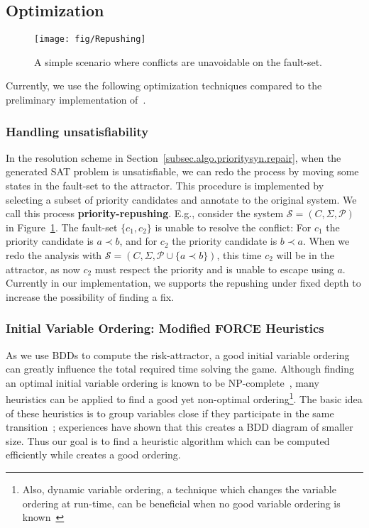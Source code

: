 \documentclass[10pt, a4paper, onecolumn, conference, compsocconf]{IEEEtran}
\begin{document}
\subsection{Optimization}

\begin{figure}[t]
\centering
 \texttt{[image: fig/Repushing]}
  \caption{A simple scenario where conflicts are unavoidable on the fault-set.}
 \label{fig:vissbip.repushing}
\end{figure}

Currently, we use the following optimization techniques compared to the preliminary implementation of~\cite{cheng:vissbip:2011}.

\subsubsection{Handling unsatisfiability}
In the resolution scheme in Section~\ref{subsec.algo.prioritysyn.repair}, when the generated SAT problem is unsatisfiable, we can redo the process by moving some states in the fault-set to the attractor. This procedure is implemented by selecting a subset of priority candidates and annotate to the original system. We call this process \textbf{priority-repushing}. E.g., consider the system $\mathcal{S} = (C , \Sigma, \mathcal{P})$ in Figure~\ref{fig:vissbip.repushing}. The fault-set $\{c_1, c_2\}$ is unable to resolve the conflict: For $c_1$ the priority candidate is $a \prec b$, and for $c_2$ the priority candidate is $b \prec a$. When we redo the analysis with $\mathcal{S} = (C , \Sigma, \mathcal{P} \cup \{a \prec b\})$, this time $c_2$ will be in the attractor, as now $c_2$ must respect the priority and is unable to escape using $a$. Currently in our implementation, we supports the repushing under fixed depth to increase the possibility of finding a fix.

\subsubsection{Initial Variable Ordering: Modified FORCE Heuristics}
As we use BDDs to compute the risk-attractor, a good initial variable ordering can greatly influence the total required time solving the game. Although finding an optimal initial variable ordering is known to be NP-complete~\cite{tani1993complexity}, many heuristics can be applied to find a good yet non-optimal ordering\footnote{Also, dynamic variable ordering, a technique which changes the variable ordering at run-time, can be beneficial when no good variable ordering is known~\cite{clarke1999mc}}. The basic idea of these heuristics is to group variables close if they participate in the same transition~\cite{clarke1999mc}; experiences have shown that this creates a BDD diagram of smaller size. Thus our goal is to find a heuristic algorithm which can be computed efficiently while creates a good ordering.
\end{document}
